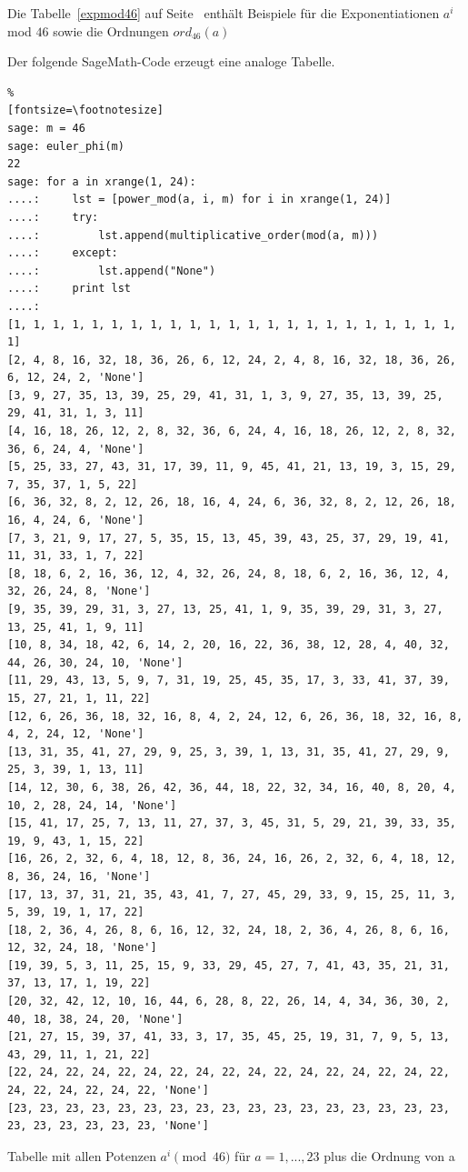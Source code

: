 \begin{refsegment}
\newpage
\hypertarget{nt:AppArith3c}{}
\label{nt:AppArith3c}{}
Die Tabelle~\ref{expmod46} auf Seite~\pageref{SrcArith3c} enthält Beispiele
für die Exponentiationen $a^i$ mod $46$ sowie die Ordnungen $ord_{46}(a)$

Der folgende SageMath-Code erzeugt eine analoge Tabelle.

\begin{sagecode}
\begin{Verbatim}%
[fontsize=\footnotesize]
sage: m = 46
sage: euler_phi(m)
22
sage: for a in xrange(1, 24):
....:     lst = [power_mod(a, i, m) for i in xrange(1, 24)]
....:     try:
....:         lst.append(multiplicative_order(mod(a, m)))
....:     except:
....:         lst.append("None")
....:     print lst
....:
[1, 1, 1, 1, 1, 1, 1, 1, 1, 1, 1, 1, 1, 1, 1, 1, 1, 1, 1, 1, 1, 1, 1, 1]
[2, 4, 8, 16, 32, 18, 36, 26, 6, 12, 24, 2, 4, 8, 16, 32, 18, 36, 26, 6, 12, 24, 2, 'None']
[3, 9, 27, 35, 13, 39, 25, 29, 41, 31, 1, 3, 9, 27, 35, 13, 39, 25, 29, 41, 31, 1, 3, 11]
[4, 16, 18, 26, 12, 2, 8, 32, 36, 6, 24, 4, 16, 18, 26, 12, 2, 8, 32, 36, 6, 24, 4, 'None']
[5, 25, 33, 27, 43, 31, 17, 39, 11, 9, 45, 41, 21, 13, 19, 3, 15, 29, 7, 35, 37, 1, 5, 22]
[6, 36, 32, 8, 2, 12, 26, 18, 16, 4, 24, 6, 36, 32, 8, 2, 12, 26, 18, 16, 4, 24, 6, 'None']
[7, 3, 21, 9, 17, 27, 5, 35, 15, 13, 45, 39, 43, 25, 37, 29, 19, 41, 11, 31, 33, 1, 7, 22]
[8, 18, 6, 2, 16, 36, 12, 4, 32, 26, 24, 8, 18, 6, 2, 16, 36, 12, 4, 32, 26, 24, 8, 'None']
[9, 35, 39, 29, 31, 3, 27, 13, 25, 41, 1, 9, 35, 39, 29, 31, 3, 27, 13, 25, 41, 1, 9, 11]
[10, 8, 34, 18, 42, 6, 14, 2, 20, 16, 22, 36, 38, 12, 28, 4, 40, 32, 44, 26, 30, 24, 10, 'None']
[11, 29, 43, 13, 5, 9, 7, 31, 19, 25, 45, 35, 17, 3, 33, 41, 37, 39, 15, 27, 21, 1, 11, 22]
[12, 6, 26, 36, 18, 32, 16, 8, 4, 2, 24, 12, 6, 26, 36, 18, 32, 16, 8, 4, 2, 24, 12, 'None']
[13, 31, 35, 41, 27, 29, 9, 25, 3, 39, 1, 13, 31, 35, 41, 27, 29, 9, 25, 3, 39, 1, 13, 11]
[14, 12, 30, 6, 38, 26, 42, 36, 44, 18, 22, 32, 34, 16, 40, 8, 20, 4, 10, 2, 28, 24, 14, 'None']
[15, 41, 17, 25, 7, 13, 11, 27, 37, 3, 45, 31, 5, 29, 21, 39, 33, 35, 19, 9, 43, 1, 15, 22]
[16, 26, 2, 32, 6, 4, 18, 12, 8, 36, 24, 16, 26, 2, 32, 6, 4, 18, 12, 8, 36, 24, 16, 'None']
[17, 13, 37, 31, 21, 35, 43, 41, 7, 27, 45, 29, 33, 9, 15, 25, 11, 3, 5, 39, 19, 1, 17, 22]
[18, 2, 36, 4, 26, 8, 6, 16, 12, 32, 24, 18, 2, 36, 4, 26, 8, 6, 16, 12, 32, 24, 18, 'None']
[19, 39, 5, 3, 11, 25, 15, 9, 33, 29, 45, 27, 7, 41, 43, 35, 21, 31, 37, 13, 17, 1, 19, 22]
[20, 32, 42, 12, 10, 16, 44, 6, 28, 8, 22, 26, 14, 4, 34, 36, 30, 2, 40, 18, 38, 24, 20, 'None']
[21, 27, 15, 39, 37, 41, 33, 3, 17, 35, 45, 25, 19, 31, 7, 9, 5, 13, 43, 29, 11, 1, 21, 22]
[22, 24, 22, 24, 22, 24, 22, 24, 22, 24, 22, 24, 22, 24, 22, 24, 22, 24, 22, 24, 22, 24, 22, 'None']
[23, 23, 23, 23, 23, 23, 23, 23, 23, 23, 23, 23, 23, 23, 23, 23, 23, 23, 23, 23, 23, 23, 23, 'None']
\end{Verbatim}
\caption{Tabelle mit allen Potenzen $a^i \pmod{46}$ für $a=1,...,23$ plus die Ordnung von a}
\label{nt_Sage-code_MultOrder_expmod46}
\end{sagecode}





\end{refsegment}
